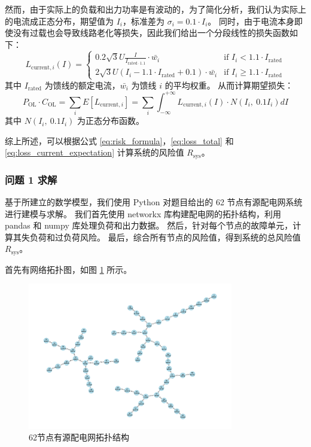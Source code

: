 \documentclass{article}
\begin{document}
然而，由于实际上的负载和出力功率是有波动的，为了简化分析，我们认为实际上的电流成正态分布，期望值为 $I_i$，标准差为 $\sigma_i = 0.1 \cdot I_i$。
同时，由于电流本身即使没有过载也会导致线路老化等损失，因此我们给出一个分段线性的损失函数如下：
\begin{equation}\label{eq:loss_current}
  L_{\text{current},i} (I) =
  \begin{cases}
    0.2 \sqrt{3} U \frac{I}{I_{\text{rated} \cdot 1.1}} \cdot \bar{w_i} & \text{if } I_i < 1.1 \cdot I_{\text{rated}} \\
    2 \sqrt{3} U (I_i - 1.1 \cdot I_{\text{rated}} + 0.1) \cdot \bar{w_i} & \text{if } I_i \geq 1.1 \cdot I_{\text{rated}}
  \end{cases}
\end{equation}
其中 $I_{\text{rated}}$ 为馈线的额定电流，$\bar{w_i}$ 为馈线 $i$ 的平均权重。
从而计算期望损失：
\begin{equation}\label{eq:loss_current_expectation}
  P_{\text{OL}} \cdot C_{\text{OL}}
  = \sum_i E[L_{\text{current},i}]
  = \sum_i \int_{-\infty}^{+\infty} L_{\text{current},i}(I) \cdot N(I_i,\ 0.1 I_i) dI
\end{equation}
其中 $N(I_i,\ 0.1 I_i)$ 为正态分布函数。

综上所述，可以根据公式 \ref{eq:risk_formula}，\ref{eq:loss_total} 和 \ref{eq:loss_current_expectation} 计算系统的风险值 $R_{\text{sys}}$。

\subsubsection{问题 1 求解}\label{subsubsec:problem1_solve}

基于所建立的数学模型，我们使用 Python 对题目给出的 62 节点有源配电网系统进行建模与求解。
我们首先使用 networkx 库构建配电网的拓扑结构，利用 pandas 和 numpy 库处理负荷和出力数据。
然后，针对每个节点的故障单元，计算其失负荷和过负荷风险。
最后，综合所有节点的风险值，得到系统的总风险值 $R_{\text{sys}}$。

首先有网络拓扑图，如图 \ref{fig:network_topology} 所示。

\begin{figure}[htbp]
  \centering
  \includegraphics[width=0.8\textwidth]{problem1/topology_graph.png}
  \caption{62节点有源配电网拓扑结构}
  \label{fig:network_topology}
\end{figure}
\end{document}
